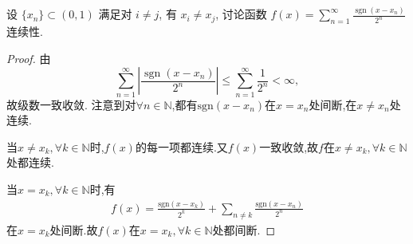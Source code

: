 \documentclass[../../main.tex]{subfiles}
\begin{document}
\begin{example}
设 $\{x_n\} \subset (0,1)$ 满足对 $i \neq j$, 有 $x_i \neq x_j$, 讨论函数 $f(x) = \sum\limits_{n=1}^\infty \frac{\operatorname{sgn}(x - x_n)}{2^n}$ 连续性.
\end{example}
\begin{proof}
由
\[
\sum\limits_{n=1}^\infty \left| \frac{\operatorname{sgn}(x - x_n)}{2^n} \right| \leqslant \sum\limits_{n=1}^\infty \frac{1}{2^n} < \infty,
\]
故级数一致收敛. 注意到对$\forall n\in \mathbb{N} $,都有$\mathrm{sgn} \left( x-x_n \right) $在$x=x_n$处间断,在$x\ne x_n$处连续.

当$x\ne x_k,\forall k\in \mathbb{N} $时,$f\left( x \right) $的每一项都连续.又$f\left( x \right) $一致收敛,故$f$在$x\ne x_k,\forall k\in \mathbb{N} $处都连续.

当$x=x_k,\forall k\in \mathbb{N} $时,有
\begin{align*}
f\left( x \right) =\frac{\mathrm{sgn} \left( x-x_k \right)}{2^k}+\sum\limits_{n\ne k}{\frac{\mathrm{sgn} \left( x-x_n \right)}{2^n}}
\end{align*}
在$x=x_k$处间断.故$f\left( x \right) $在$x=x_k,\forall k\in \mathbb{N} $处都间断.

\end{proof}
\end{document}
